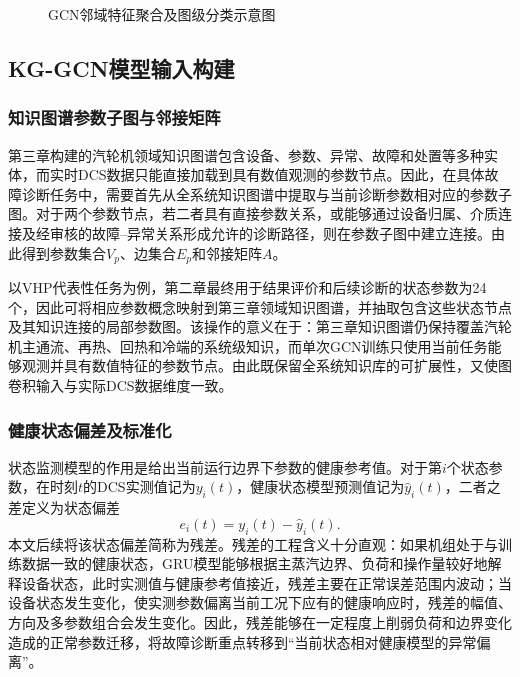 \begin{figure}[htbp]
    \centering
    \caption{GCN邻域特征聚合及图级分类示意图}
    \label{fig:gcn_aggregation_v2}
\end{figure}

\subsection{KG-GCN模型输入构建}
\label{subsec:kg_gcn_input_v2}

\subsubsection{知识图谱参数子图与邻接矩阵}

第三章构建的汽轮机领域知识图谱包含设备、参数、异常、故障和处置等多种实体，而实时DCS数据只能直接加载到具有数值观测的参数节点。因此，在具体故障诊断任务中，需要首先从全系统知识图谱中提取与当前诊断参数相对应的参数子图。对于两个参数节点，若二者具有直接参数关系，或能够通过设备归属、介质连接及经审核的故障--异常关系形成允许的诊断路径，则在参数子图中建立连接。由此得到参数集合$V_p$、边集合$E_p$和邻接矩阵$A$。

以VHP代表性任务为例，第二章最终用于结果评价和后续诊断的状态参数为24个，因此可将相应参数概念映射到第三章领域知识图谱，并抽取包含这些状态节点及其知识连接的局部参数图。该操作的意义在于：第三章知识图谱仍保持覆盖汽轮机主通流、再热、回热和冷端的系统级知识，而单次GCN训练只使用当前任务能够观测并具有数值特征的参数节点。由此既保留全系统知识库的可扩展性，又使图卷积输入与实际DCS数据维度一致。

\subsubsection{健康状态偏差及标准化}

状态监测模型的作用是给出当前运行边界下参数的健康参考值。对于第$i$个状态参数，在时刻$t$的DCS实测值记为$y_i(t)$，健康状态模型预测值记为$\hat y_i(t)$，二者之差定义为状态偏差
\begin{equation}
    e_i(t)=y_i(t)-\hat y_i(t).
\end{equation}
本文后续将该状态偏差简称为残差。残差的工程含义十分直观：如果机组处于与训练数据一致的健康状态，GRU模型能够根据主蒸汽边界、负荷和操作量较好地解释设备状态，此时实测值与健康参考值接近，残差主要在正常误差范围内波动；当设备状态发生变化，使实测参数偏离当前工况下应有的健康响应时，残差的幅值、方向及多参数组合会发生变化。因此，残差能够在一定程度上削弱负荷和边界变化造成的正常参数迁移，将故障诊断重点转移到“当前状态相对健康模型的异常偏离”。


